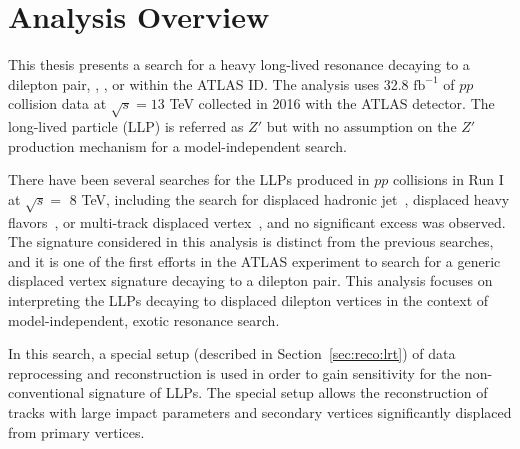 \chapter{Analysis Overview}
\label{chap:analysis_overview}

This thesis presents a search for a heavy long-lived resonance decaying to a dilepton pair, \mumu, \ee, or \emu within the ATLAS ID. The analysis uses 32.8 $\mathrm{fb^{-1}}$ of $pp$ collision data at $\sqrt{s}=13$ TeV collected in 2016 with the ATLAS detector. The long-lived particle (LLP) is referred as $Z'$ but with no assumption on the $Z'$ production mechanism for a model-independent search.

There have been several searches for the LLPs produced in $pp$ collisions in Run I at $\sqrt{s} =$ 8 TeV, including the search for displaced hadronic jet~\cite{Blackburn:1550730}, displaced heavy flavors~\cite{Harris:1512932}, or multi-track displaced vertex~\cite{Aad:2015rba}, and no significant excess was observed. The signature considered in this analysis is distinct from the previous searches, and it is one of the first efforts in the ATLAS experiment to search for a generic displaced vertex signature decaying to a dilepton pair. This analysis focuses on interpreting the LLPs decaying to displaced dilepton vertices in the context of model-independent, exotic resonance search.

In this search, a special setup (described in Section~\ref{sec:reco:lrt}) of data reprocessing and reconstruction is used in order to gain sensitivity for the non-conventional signature of LLPs. The special setup allows the reconstruction of tracks with large impact parameters and secondary vertices significantly displaced from primary vertices. 
